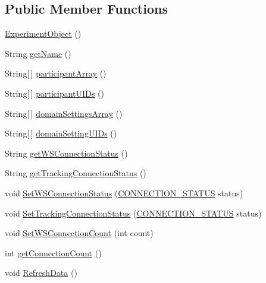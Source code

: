 \subsection*{Public Member Functions}
\begin{DoxyCompactItemize}
\item 
\hyperlink{class_web_analyzer_1_1_u_i_1_1_interaction_objects_1_1_experiment_object_ab4ec83c3bd5603ccc5f88d1e6a7638a2}{Experiment\+Object} ()
\item 
String \hyperlink{class_web_analyzer_1_1_u_i_1_1_interaction_objects_1_1_experiment_object_a5e02c96733933f6e14d50f48fcaf4edc}{get\+Name} ()
\item 
String\mbox{[}$\,$\mbox{]} \hyperlink{class_web_analyzer_1_1_u_i_1_1_interaction_objects_1_1_experiment_object_a1a43f8d6cc9b6b773681f766d8273023}{participant\+Array} ()
\item 
String\mbox{[}$\,$\mbox{]} \hyperlink{class_web_analyzer_1_1_u_i_1_1_interaction_objects_1_1_experiment_object_a5f4674c9f3a4ef9214bd6722f356ff14}{participant\+U\+I\+Ds} ()
\item 
String\mbox{[}$\,$\mbox{]} \hyperlink{class_web_analyzer_1_1_u_i_1_1_interaction_objects_1_1_experiment_object_a150c4672bd1ed68b1db01cf2391107ec}{domain\+Settings\+Array} ()
\item 
String\mbox{[}$\,$\mbox{]} \hyperlink{class_web_analyzer_1_1_u_i_1_1_interaction_objects_1_1_experiment_object_ad35fa2e95cd9c5b7f51a033bebe87beb}{domain\+Setting\+U\+I\+Ds} ()
\item 
String \hyperlink{class_web_analyzer_1_1_u_i_1_1_interaction_objects_1_1_experiment_object_a752a6ca906248d36a0e4251a2bf16959}{get\+W\+S\+Connection\+Status} ()
\item 
String \hyperlink{class_web_analyzer_1_1_u_i_1_1_interaction_objects_1_1_experiment_object_a2116c6efb6ed86405de36aaa6947045b}{get\+Tracking\+Connection\+Status} ()
\item 
void \hyperlink{class_web_analyzer_1_1_u_i_1_1_interaction_objects_1_1_experiment_object_ad7c2424ce1f5611ec7fe303d362b959d}{Set\+W\+S\+Connection\+Status} (\hyperlink{class_web_analyzer_1_1_u_i_1_1_interaction_objects_1_1_experiment_object_a2875208b4f4b0ed643593152f4ec025c}{C\+O\+N\+N\+E\+C\+T\+I\+O\+N\+\_\+\+S\+T\+A\+T\+U\+S} status)
\item 
void \hyperlink{class_web_analyzer_1_1_u_i_1_1_interaction_objects_1_1_experiment_object_a2fb6e773317ff48802d4f5fda022005c}{Set\+Tracking\+Connection\+Status} (\hyperlink{class_web_analyzer_1_1_u_i_1_1_interaction_objects_1_1_experiment_object_a2875208b4f4b0ed643593152f4ec025c}{C\+O\+N\+N\+E\+C\+T\+I\+O\+N\+\_\+\+S\+T\+A\+T\+U\+S} status)
\item 
void \hyperlink{class_web_analyzer_1_1_u_i_1_1_interaction_objects_1_1_experiment_object_a4a6279a2c406c90ad9339cbf44a64d36}{Set\+W\+S\+Connection\+Count} (int count)
\item 
int \hyperlink{class_web_analyzer_1_1_u_i_1_1_interaction_objects_1_1_experiment_object_aeb82fcd6bba971c2e08d59b236ee37c9}{get\+Connection\+Count} ()
\item 
void \hyperlink{class_web_analyzer_1_1_u_i_1_1_interaction_objects_1_1_experiment_object_a11b8d543111e03266b1c22d601131376}{Refresh\+Data} ()
\end{DoxyCompactItemize}
